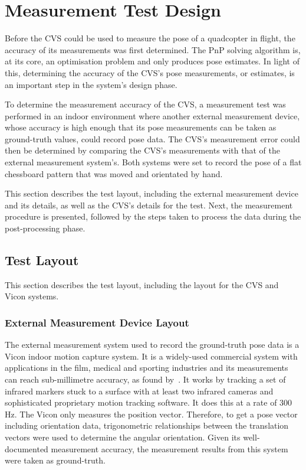 \section{Measurement Test Design}

Before the CVS could be used to measure the pose of a quadcopter in flight, the accuracy of its measurements was first determined. The PnP solving algorithm is, at its core, an optimisation problem and only produces pose estimates. In light of this, determining the accuracy of the CVS's pose measurements, or estimates, is an important step in the system's design phase. 

To determine the measurement accuracy of the CVS, a measurement test was performed in an indoor environment where another external measurement device, whose accuracy is high enough that its pose measurements can be taken as ground-truth values, could record pose data. The CVS's measurement error could then be determined by comparing the CVS's measurements with that of the external measurement system's. Both systems were set to record the pose of a flat chessboard pattern that was moved and orientated by hand.

This section describes the test layout, including the external measurement device and its details, as well as the CVS's details for the test. Next, the measurement procedure is presented, followed by the steps taken to process the data during the post-processing phase. 

\subsection{Test Layout}
\label{sec:vicon-test-setup}

This section describes the test layout, including the layout for the CVS and Vicon systems. 

\subsubsection{External Measurement Device Layout}

The external measurement system used to record the ground-truth pose data is a Vicon indoor motion capture system. It is a widely-used commercial system with applications in the film, medical and sporting industries and its measurements can reach sub-millimetre accuracy, as found by~\cite{windolf2008systematic}. It works by tracking a set of infrared markers stuck to a surface with at least two infrared cameras and sophisticated proprietary motion tracking software. It does this at a rate of 300 Hz. The Vicon only measures the position vector. Therefore, to get a pose vector including orientation data, trigonometric relationships between the translation vectors were used to determine the angular orientation. Given its well-documented measurement accuracy, the measurement results from this system were taken as ground-truth.

